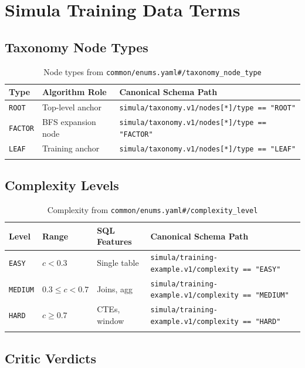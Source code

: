 \documentclass[11pt,a4paper]{report}
\newcommand{\schemapath}[1]{\texttt{\textcolor{pathcolor}{#1}}}
\newcommand{\enumval}[1]{\texttt{\textcolor{sapgreen}{#1}}}
\begin{document}
\chapter{Simula Training Data Terms}

\section{Taxonomy Node Types}

\begin{longtable}{@{}p{2cm}p{4cm}p{6cm}@{}}
\toprule
\textbf{Type} & \textbf{Algorithm Role} & \textbf{Canonical Schema Path} \\
\midrule
\endhead
\enumval{ROOT} & Top-level anchor & \schemapath{simula/taxonomy.v1/nodes[*]/type == "ROOT"} \\
\enumval{FACTOR} & BFS expansion node & \schemapath{simula/taxonomy.v1/nodes[*]/type == "FACTOR"} \\
\enumval{LEAF} & Training anchor & \schemapath{simula/taxonomy.v1/nodes[*]/type == "LEAF"} \\
\bottomrule
\caption{Node types from \schemapath{common/enums.yaml\#/taxonomy\_node\_type}}
\end{longtable}

\section{Complexity Levels}

\begin{longtable}{@{}p{2cm}p{2cm}p{3cm}p{4.5cm}@{}}
\toprule
\textbf{Level} & \textbf{Range} & \textbf{SQL Features} & \textbf{Canonical Schema Path} \\
\midrule
\endhead
\enumval{EASY} & $c < 0.3$ & Single table & \schemapath{simula/training-example.v1/complexity == "EASY"} \\
\enumval{MEDIUM} & $0.3 \leq c < 0.7$ & Joins, agg & \schemapath{simula/training-example.v1/complexity == "MEDIUM"} \\
\enumval{HARD} & $c \geq 0.7$ & CTEs, window & \schemapath{simula/training-example.v1/complexity == "HARD"} \\
\bottomrule
\caption{Complexity from \schemapath{common/enums.yaml\#/complexity\_level}}
\end{longtable}

\section{Critic Verdicts}
\end{document}
